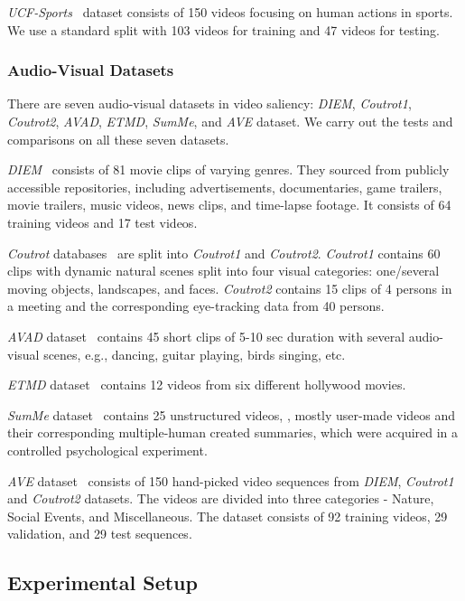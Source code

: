 \documentclass[letterpaper, 10 pt, conference]{ieeeconf}  \usepackage{times}
\begin{document}
\emph{UCF-Sports}~\cite{rodriguez2008action} dataset consists of 150 videos focusing on human actions in sports. We use a standard split with 103 videos for training and 47 videos for testing. 

\subsubsection{Audio-Visual Datasets}
There are seven audio-visual datasets in video saliency: \emph{DIEM}, \emph{Coutrot1}, \emph{Coutrot2}, \emph{AVAD}, \emph{ETMD}, \emph{SumMe}, and \emph{AVE} dataset. We carry out the tests and comparisons on all these seven datasets. 

\emph{DIEM}~\cite{mital2011clustering} consists of 81 movie clips of varying genres. They sourced from publicly accessible repositories, including advertisements, documentaries, game trailers, movie trailers, music videos, news clips, and time-lapse footage. It consists of 64 training videos and 17 test videos.

\emph{Coutrot} databases~\cite{coutrot2014saliency,coutrot2016multimodal} are split into \emph{Coutrot1} and \emph{Coutrot2}. \emph{Coutrot1} contains 60 clips with dynamic natural scenes split into four visual categories: one/several moving objects, landscapes, and faces. \emph{Coutrot2} contains 15 clips of 4 persons in a meeting and the corresponding eye-tracking data from 40 persons. 

\emph{AVAD} dataset~\cite{min2016fixation} contains 45 short clips of 5-10 sec duration with several audio-visual scenes, e.g., dancing, guitar playing, birds singing, etc. 

\emph{ETMD} dataset~\cite{koutras2015perceptually} contains 12 videos from six different hollywood movies.

\emph{SumMe} dataset~\cite{gygli2014creating} contains 25 unstructured videos, \ie, mostly user-made videos and their corresponding multiple-human created summaries, which were acquired in a controlled psychological experiment.

\emph{AVE} dataset~\cite{tavakoli2019dave} consists of 150 hand-picked video sequences from \emph{DIEM}, \emph{Coutrot1} and \emph{Coutrot2} datasets. The videos are divided into three categories - Nature, Social Events, and Miscellaneous. The dataset consists of 92 training videos, 29 validation, and 29 test sequences.

\subsection{Experimental Setup}
\label{subsec:Expsetup}
\end{document}

